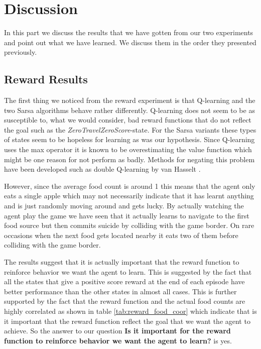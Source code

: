 \documentclass[result.tex]{subfiles}
\begin{document}
    \section*{\centering Discussion}

    In this part we discuss the results that we have gotten from our two experiments and point out what we have learned. We discuss them in the order they presented previously.

    \subsection*{Reward Results}

    The first thing we noticed from the reward experiment is that Q-learning and the two Sarsa algorithms behave rather differently. Q-learning does not seem to be as susceptible to, what we would consider, bad reward functions that do not reflect the goal such as the \textit{ZeroTravelZeroScore}-state. For the Sarsa variants these types of states seem to be hopeless for learning as was our hypothesis. Since Q-learning uses the max operator it is known to be overestimating the value function which might be one reason for not perform as badly. Methods for negating this problem have been developed such as double Q-learning by van Hasselt \cite{hasselt2010double}.

    However, since the average food count is around 1 this means that the agent only eats a single apple which may not necessarily indicate that it has learnt anything and is just randomly moving around and gets lucky. By actually watching the agent play the game we have seen that it actually learns to navigate to the first food source but then commits suicide by colliding with the game border. On rare occasions when the next food gets located nearby it eats two of them before colliding with the game border.

    The results suggest that it is actually important that the reward function to reinforce behavior we want the agent to learn. This is suggested by the fact that all the states that give a positive score reward at the end of each episode have better performance than the other states in almost all cases. This is further supported by the fact that the reward function and the actual food counts are highly correlated as shown in table \ref{tab:reward_food_coor} which indicate that is it important that the reward function reflect the goal that we want the agent to achieve. So the answer to our question \textbf{Is it important for the reward function to reinforce behavior we
    want the agent to learn?} is yes.
\end{document}
